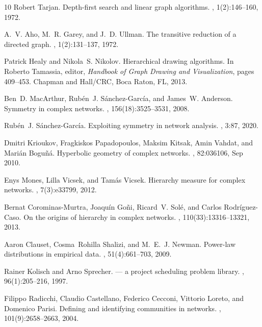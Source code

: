 \documentclass[11pt,a4paper]{article}
\begin{document}
\begin{thebibliography}{10}
Robert Tarjan.
\newblock Depth-first search and linear graph algorithms.
, 1(2):146--160, 1972.

A.~V. Aho, M.~R. Garey, and J.~D. Ullman.
\newblock The transitive reduction of a directed graph.
, 1(2):131--137, 1972.

Patrick Healy and Nikola~S. Nikolov.
\newblock Hierarchical drawing algorithms.
\newblock In Roberto Tamassia, editor, {\em Handbook of Graph Drawing and
  Visualization}, pages 409--453. Chapman and Hall/CRC, Boca Raton, FL, 2013.

Ben~D. MacArthur, Rub{\'e}n~J. S{\'a}nchez-Garc{\'i}a, and James~W. Anderson.
\newblock Symmetry in complex networks.
, 156(18):3525--3531, 2008.

Rub{\'e}n~J. S{\'a}nchez-Garc{\'i}a.
\newblock Exploiting symmetry in network analysis.
, 3:87, 2020.

Dmitri Krioukov, Fragkiskos Papadopoulos, Maksim Kitsak, Amin Vahdat, and
  Mari{\'a}n Bogu{\~n}{\'a}.
\newblock Hyperbolic geometry of complex networks.
, 82:036106, Sep 2010.

Enys Mones, Lilla Vicsek, and Tam{\'a}s Vicsek.
\newblock Hierarchy measure for complex networks.
, 7(3):e33799, 2012.

Bernat Corominas-Murtra, Joaqu{\'i}n Go{\~n}i, Ricard~V. Sol{\'e}, and Carlos
  Rodr{\'i}guez-Caso.
\newblock On the origins of hierarchy in complex networks.
,
  110(33):13316--13321, 2013.

Aaron Clauset, Cosma~Rohilla Shalizi, and M.~E.~J. Newman.
\newblock Power-law distributions in empirical data.
, 51(4):661--703, 2009.

Rainer Kolisch and Arno Sprecher.
 --- a project scheduling problem library.
, 96(1):205--216, 1997.

Filippo Radicchi, Claudio Castellano, Federico Cecconi, Vittorio Loreto, and
  Domenico Parisi.
\newblock Defining and identifying communities in networks.
,
  101(9):2658--2663, 2004.


\end{thebibliography}
\end{document}
